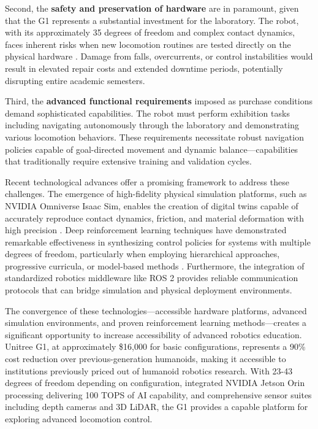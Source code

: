 \documentclass[12pt,a4paper]{article}
\begin{document}
Second, the \textbf{safety and preservation of hardware} are in paramount,  given that the G1 represents a substantial investment for the laboratory. The robot, with its approximately 35 degrees of freedom and complex contact dynamics, faces inherent risks when new locomotion routines are tested directly on the physical hardware \parencite{unitree2024}. Damage from falls, overcurrents, or control instabilities would result in elevated repair costs and extended downtime periods, potentially disrupting entire academic semesters.

Third, the \textbf{advanced functional requirements} imposed as purchase conditions demand sophisticated capabilities. The robot must perform exhibition tasks including navigating autonomously through the laboratory and demonstrating various locomotion behaviors. These requirements necessitate robust navigation policies capable of goal-directed movement and dynamic balance—capabilities that traditionally require extensive training and validation cycles.

Recent technological advances offer a promising framework to address these challenges. The emergence of high-fidelity physical simulation platforms, such as NVIDIA Omniverse Isaac Sim, enables the creation of digital twins capable of accurately reproduce contact dynamics, friction, and material deformation with high precision \parencite{nvidia2024isaac}. Deep reinforcement learning techniques have demonstrated remarkable effectiveness in synthesizing control policies for systems with multiple degrees of freedom, particularly when employing hierarchical approaches, progressive curricula, or model-based methods \parencite{humanoidgym2024}. Furthermore, the integration of standardized robotics middleware like ROS 2 provides reliable communication protocols that can bridge simulation and physical deployment environments.

The convergence of these technologies—accessible hardware platforms, advanced simulation environments, and proven reinforcement learning methods—creates a significant opportunity to increase accessibility of advanced robotics education. Unitree G1, at approximately \$16,000 for basic configurations, represents a 90\% cost reduction over previous-generation humanoids, making it accessible to institutions previously priced out of humanoid robotics research. With 23-43 degrees of freedom depending on configuration, integrated NVIDIA Jetson Orin processing delivering 100 TOPS of AI capability, and comprehensive sensor suites including depth cameras and 3D LiDAR, the G1 provides a capable platform for exploring advanced locomotion control.
\end{document}
